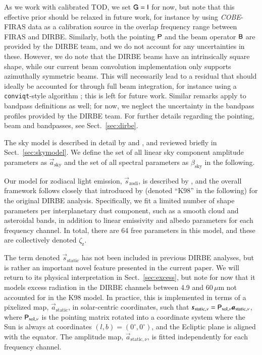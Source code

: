 \documentclass{aa}
\def\COBE{\textit{COBE}}
\newcommand{\B}[0]{\tens{B}}
\renewcommand{\G}[0]{\tens{G}}
\newcommand{\s}[0]{\vec{s}}
\renewcommand{\a}[0]{\vec{a}}
\renewcommand{\P}[0]{\tens{P}}
\begin{document}
As we work with calibrated TOD, we set $\G=\tens{I}$ for now, but
note that this effective prior should be relaxed in future work, for
instance by using \COBE-FIRAS data as a calibration source in the
overlap frequency range between FIRAS and DIRBE. Similarly, both the
pointing $\P$ and the beam operator $\B$ are provided by the DIRBE
team, and we do not account for any uncertainties in these. However,
we do note that the DIRBE beams have an intrinsically square shape,
while our current beam convolution implementation only supports
azimuthally symmetric beams. This will necessarily lead to a residual
that should ideally be accounted for through full beam integration,
for instance using a \texttt{conviqt}-style algorithm
\citep{prezeau2010,keihanen2012}; this is left for future
work. Similar remarks apply to bandpass definitions as well; for now,
we neglect the uncertainty in the bandpass profiles provided by the
DIRBE team. For further details regarding the pointing, beam and
bandpasses, see Sect.~\ref{sec:dirbe}.

The sky model is described in detail by \citet{CG02_04} and \citet{CG02_05}, and
reviewed briefly in Sect.~\ref{sec:skymodel}. We define the set of all
linear sky component amplitude parameters as $\a_{\mathrm{sky}}$ and
the set of all spectral parameters as $\beta_{\mathrm{sky}}$ in the
following.

Our model for zodiacal light emission, $\s_{\mathrm{zodi}}$, is
described by \citet{CG02_02}, and the overall framework follows
closely that introduced by \citet{kelsall1998} (denoted ``K98'' in the
following) for the original DIRBE analysis. Specifically, we fit a
limited number of shape parameters per interplanetary dust component,
such as a smooth cloud and asteroidal bands, in addition to linear
emissivity and albedo parameters for each frequency channel. In total,
there are 64 free parameters in this model, and these are collectively
denoted $\zeta_{\mathrm{z}}$.

The term denoted $\s_{\mathrm{static}}$ has not been included in
previous DIRBE analyses, but is rather an important novel feature
presented in the current paper. We will return to its physical
interpretation in Sect.~\ref{sec:excess}, but note for now that it
models excess radiation in the DIRBE channels between 4.9 and
60$\,\mu$m not accounted for in the K98 model. In practice, this is
implemented in terms of a pixelized map, $\a_{\mathrm{static}}$, in
solar-centric coordinates, such that $\s_{\mathrm{static},\nu} =
\P_{\mathrm{sol},\nu}\a_{\mathrm{static},\nu}$, where
$\P_{\mathrm{sol},\nu}$ is the pointing matrix rotated into a
coordinate system where the Sun is always at coordinates
$(l,b)=(0^{\circ},0^{\circ})$, and the Ecliptic plane is aligned with
the equator. The amplitude map, $\a_{\mathrm{static},\nu}$, is fitted
independently for each frequency channel.
\end{document}
